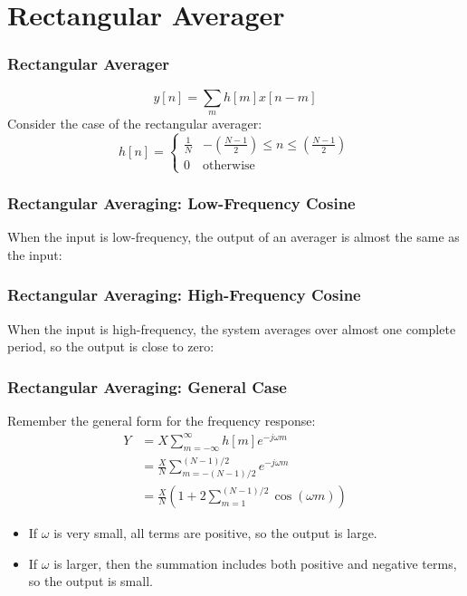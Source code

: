\documentclass{beamer}
\begin{document}
\section{Rectangular Averager}
\setcounter{subsection}{1}

\begin{frame}
  \frametitle{Rectangular Averager}

  \begin{displaymath}
    y[n]=\sum_m h[m]x[n-m]
  \end{displaymath}
  Consider the case of the rectangular averager:
  \begin{displaymath}
    h[n]=\left\{\begin{array}{ll}
    \frac{1}{N} & -\left(\frac{N-1}{2}\right)\le n\le \left(\frac{N-1}{2}\right)\\
    0 & \mbox{otherwise}
    \end{array}\right.
  \end{displaymath}
\end{frame}

\begin{frame}
  \frametitle{Rectangular Averaging: Low-Frequency Cosine}

  When the input is low-frequency, the output of an averager is almost
  the same as the input:

  \centerline{}
\end{frame}

\begin{frame}
  \frametitle{Rectangular Averaging: High-Frequency Cosine}

  When the input is high-frequency, the system averages over almost
  one complete period, so the output is close to zero:

  \centerline{}
\end{frame}

\begin{frame}
  \frametitle{Rectangular Averaging: General Case}

  Remember the general form for the frequency response:
  \begin{align*}
    Y &= X\sum_{m=-\infty}^\infty h[m]e^{-j\omega m}\\
    &= \frac{X}{N}\sum_{m=-(N-1)/2}^{(N-1)/2} e^{-j\omega m}\\
    &= \frac{X}{N}\left(1+2\sum_{m=1}^{(N-1)/2}\cos(\omega m)\right)
  \end{align*}
  \begin{itemize}
  \item If $\omega$ is very small, all terms are positive, so the
    output is large.
  \item If $\omega$ is larger, then the summation includes both
    positive and negative terms, so the output is small.
  \end{itemize}
\end{frame}
\end{document}
